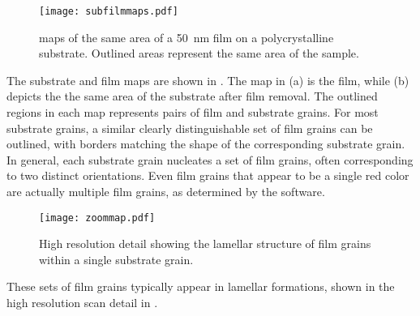 \begin{figure}
\begin{center}
	\texttt{[image: subfilmmaps.pdf]}
		\caption[ maps of film and substrate]{%
			 maps of the same area of a \SI{50}{\nano\meter}
			 film on a polycrystalline  substrate.
			Outlined areas represent the same area of the sample.}
	\label{fig:subfilmmaps}
\end{center}
\end{figure}

The substrate and film maps are shown in . The map in (a) is the film, while (b) depicts the the same area of the substrate after film removal. The outlined regions in each map represents pairs of film and substrate grains. For most substrate grains, a similar clearly distinguishable set of film grains can be outlined, with borders matching the shape of the corresponding substrate grain. In general, each substrate grain nucleates a set of film grains, often corresponding to two distinct orientations. Even film grains that appear to be a single red color are actually multiple film grains, as determined by the  software. 
\begin{figure}
\begin{center}
	\texttt{[image: zoommap.pdf]}
		\caption[Detail of  map]{%
			High resolution  detail showing the lamellar
			structure of  film grains within a single substrate
			grain.}
	\label{fig:zoommap}
\end{center}
\end{figure}
These sets of film grains typically appear in lamellar formations, shown in the high resolution scan detail in .

